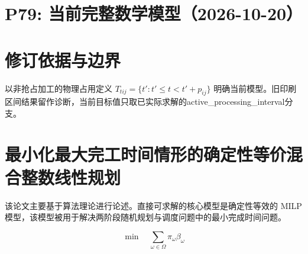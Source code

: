 \documentclass[11pt]{ctexart}
\begin{document}
\section*{P79: 当前完整数学模型（2026-10-20）}
\section*{修订依据与边界}以非抢占加工的物理占用定义 \(T_{tij}=\{t'\colon t'\leq t<t'+p_{ij}\}\) 明确当前模型。旧印刷区间结果留作诊断，当前目标值只取已实际求解的active\_processing\_interval分支。



\section*{最小化最大完工时间情形的确定性等价混合整数线性规划}
该论文主要基于算法理论进行论述。直接可求解的核心模型是确定性等效的 MILP 模型，该模型被用于解决两阶段随机规划与调度问题中的最小完成时间问题。

\begin{equation}
\min \quad \sum_{\omega \in \Omega} \pi_\omega \beta_\omega
\tag{M1}
\end{equation}
\end{document}
